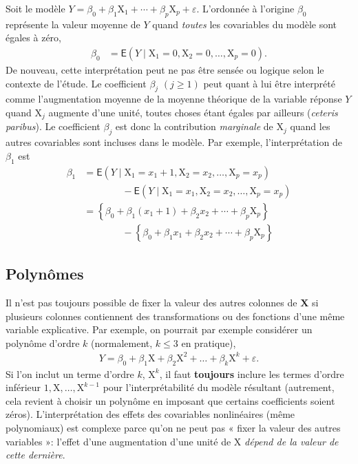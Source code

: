 \documentclass[
  11pt,
  letterpaper,
]{scrbook}
\theoremstyle{definition}
\theoremstyle{remark}
\begin{document}
Soit le modèle
\(Y= \beta_0 + \beta_1 \mathrm{X}_1 + \cdots + \beta_p\mathrm{X}_p + \varepsilon\).
L'ordonnée à l'origine \(\beta_0\) représente la valeur moyenne de \(Y\)
quand \emph{toutes} les covariables du modèle sont égales à zéro,
\begin{align*}
\beta_0 &= \mathsf{E}(Y \mid \mathrm{X}_1=0,\mathrm{X}_2=0,\ldots,\mathrm{X}_p=0).
\end{align*} De nouveau, cette interprétation peut ne pas être sensée ou
logique selon le contexte de l'étude. Le coefficient \(\beta_j\)
\((j \geq 1)\) peut quant à lui être interprété comme l'augmentation
moyenne de la moyenne théorique de la variable réponse \(Y\) quand
\(\mathrm{X}_j\) augmente d'une unité, toutes choses étant égales par
ailleurs (\emph{ceteris paribus}). Le coefficient \(\beta_j\) est donc
la contribution \emph{marginale} de \(\mathrm{X}_j\) quand les autres
covariables sont incluses dans le modèle. Par exemple, l'interprétation
de \(\beta_1\) est \begin{align*}
\beta_1 &= \mathsf{E}(Y \mid \mathrm{X}_1=x_1+1,\mathrm{X}_2=x_2,\ldots,\mathrm{X}_p=x_p) \\
& \qquad \qquad - \mathsf{E}(Y \mid \mathrm{X}_1=x_1,\mathrm{X}_2=x_2,\ldots,\mathrm{X}_p=x_p) \\
&= \left\{\beta_0 + \beta_1 (x_1+1) + \beta_2 x_2 + \cdots +\beta_p \mathrm{X}_p \right\} \\
& \qquad \qquad -\left\{\beta_0 + \beta_1 x_1 + \beta_2 x_2 + \cdots +\beta_p \mathrm{X}_p \right\}
\end{align*}

\subsection{Polynômes}\label{polynuxf4mes}

Il n'est pas toujours possible de fixer la valeur des autres colonnes de
\(\mathbf{X}\) si plusieurs colonnes contiennent des transformations ou
des fonctions d'une même variable explicative. Par exemple, on pourrait
par exemple considérer un polynôme d'ordre \(k\) (normalement,
\(k\leq 3\) en pratique), \begin{align*}
Y=\beta_0+ \beta_1 \mathrm{X}+ \beta_2 \mathrm{X}^2 + \ldots +\beta_k \mathrm{X}^k + \varepsilon.
\end{align*} Si l'on inclut un terme d'ordre \(k\), \(\mathrm{X}^k\), il
faut \textbf{toujours} inclure les termes d'ordre inférieur
\(1, \mathrm{X}, \ldots, \mathrm{X}^{k-1}\) pour l'interprétabilité du
modèle résultant (autrement, cela revient à choisir un polynôme en
imposant que certains coefficients soient zéros). L'interprétation des
effets des covariables nonlinéaires (même polynomiaux) est complexe
parce qu'on ne peut pas « fixer la valeur des autres variables »:
l'effet d'une augmentation d'une unité de \(\mathrm{X}\) \emph{dépend de
la valeur de cette dernière}.
\end{document}
